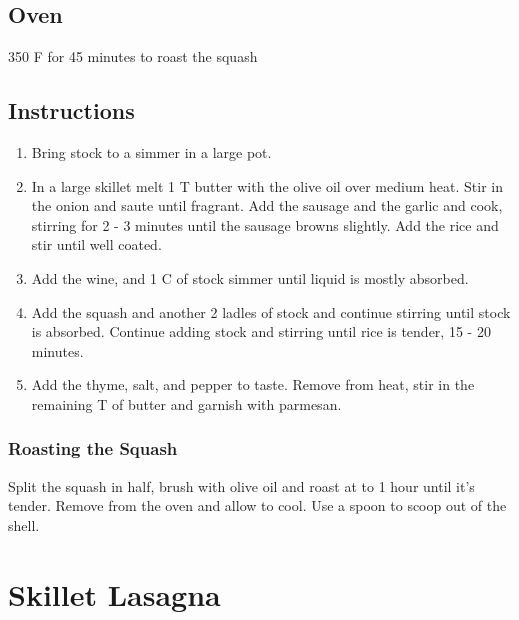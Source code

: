 \documentclass[ansiapaper,10pt,english]{sphinxmanual}
\begin{document}
\section{Oven}
\label{\detokenize{RSRisotto:oven}}
350 F for 45 minutes to roast the squash


\section{Instructions}
\label{\detokenize{RSRisotto:instructions}}\begin{enumerate}
\item {} 
Bring stock to a simmer in a large pot.

\item {} 
In a large skillet melt 1 T butter with the olive oil over medium heat. Stir in the onion and saute until fragrant. Add the sausage and the garlic and cook, stirring for 2 - 3 minutes until the sausage browns slightly. Add the rice and stir until well coated.

\item {} 
Add the wine, and 1 C of stock simmer until liquid is mostly absorbed.

\item {} 
Add the squash and another 2 ladles of stock and continue stirring until stock is absorbed. Continue adding stock and stirring until rice is tender, 15 - 20 minutes.

\item {} 
Add the thyme, salt, and pepper to taste. Remove from heat, stir in the remaining T of butter and garnish with parmesan.

\end{enumerate}


\subsection{Roasting the Squash}
\label{\detokenize{RSRisotto:roasting-the-squash}}
Split the squash in half, brush with olive oil and roast at  to 1 hour until it’s tender. Remove from the oven and allow to cool. Use a spoon to scoop out of the shell.


\chapter{Skillet Lasagna}
\label{\detokenize{Skillet_Las:skillet-lasagna}}\label{\detokenize{Skillet_Las::doc}}
\end{document}

